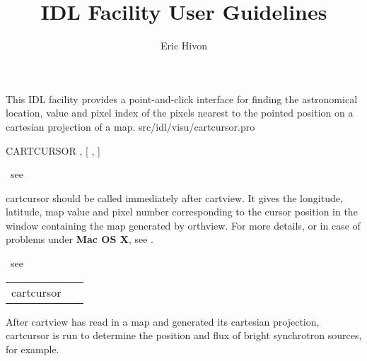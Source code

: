 




\sloppy



\title{\healpix IDL Facility User Guidelines}
 \section[cartcursor]{ }
\label{idl:\thedocid}
\author{Eric Hivon}


\begin{facility}
{This IDL facility provides a point-and-click interface for finding
the astronomical location, value and pixel index of the pixels nearest 
to the pointed position on a cartesian projection of a \healpix map.}
{src/idl/visu/cartcursor.pro}
\end{facility}

\begin{IDLformat}
{{CARTCURSOR}%
, [%
, %
]}
\end{IDLformat}

\begin{qualifiers}
\hbox{\hspace{5cm}		see }
\end{qualifiers}

\begin{codedescription}
{cartcursor should be called immediately after cartview. It gives the longitude,
latitude, map value and pixel number
corresponding to the cursor position in the window containing the map generated
by orthview. For more details, or in case
of problems under {\bf Mac OS X}, see .}
\end{codedescription}



\begin{related}
\hbox{\hspace{5cm}	see }
\end{related}


\begin{example}
{
\begin{tabular}{ll} %
cartcursor & \ 
\end{tabular}
}
{After cartview has read in a map and generated
its cartesian projection, cartcursor is run to determine the
position and flux of bright synchrotron sources, for example.}
\end{example}


